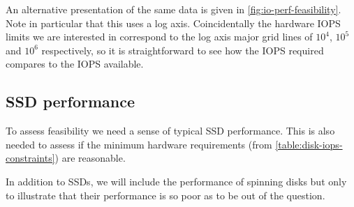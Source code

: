 \documentclass[11pt,a4paper]{article}
\begin{document}
An alternative presentation of the same data is given in \cref{fig:io-perf-feasibility}. Note in particular that this uses a log axis. Coincidentally the
hardware IOPS limits we are interested in correspond to the log axis major grid
lines of $10^4$, $10^5$ and $10^6$ respectively, so it is straightforward to
see how the IOPS required compares to the IOPS available.

\subsection{SSD performance}
\label{ssd-performance}

To assess feasibility we need a sense of typical SSD performance. This is also
needed to assess if the minimum hardware requirements (from
\cref{table:disk-iops-constraints}) are reasonable.

In addition to SSDs, we will include the performance of spinning disks but only
to illustrate that their performance is so poor as to be out of the question.
\end{document}
